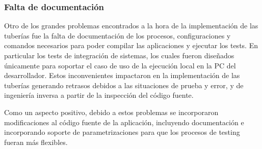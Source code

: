 \subsubsection{Falta de documentación}

Otro de los grandes problemas encontrados a la hora de la implementación de las tuberías fue la falta de documentación de los procesos, configuraciones y comandos necesarios para poder compilar las aplicaciones y ejecutar los tests. En particular los tests de integración de sistemas, los cuales fueron diseñados únicamente para soportar el caso de uso de la ejecución local en la PC del desarrollador. Estos inconvenientes impactaron en la implementación de las tuberías generando retrasos debidos a las situaciones de prueba y error, y de ingeniería inversa a partir de la inspección del código fuente.

Como un aspecto positivo, debido a estos problemas se incorporaron modificaciones al código fuente de la aplicación, incluyendo documentación e incorporando soporte de parametrizaciones para que los procesos de testing fueran más flexibles.

